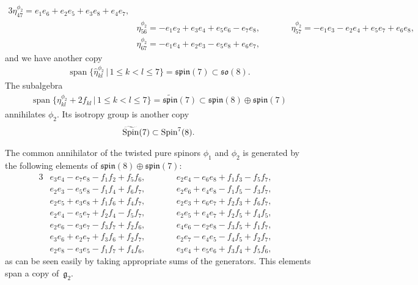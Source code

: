 \documentclass[pdftex]{sigma}
\numberwithin{equation}{section}
\begin{document}
{\begin{alignat*}{3}
 \eta^{\phi_2}_{4 7} = e_{1} e_{6} + e_{2} e_{5} + e_{3} e_{8} + e_{4} e_{7},&\\
& \eta^{\phi_2}_{5 6} = -e_{1} e_{2} + e_{3} e_{4} + e_{5} e_{6} - e_{7} e_{8},\qquad &&
 \eta^{\phi_2}_{5 7} = -e_{1} e_{3} - e_{2} e_{4} + e_{5} e_{7} + e_{6} e_{8},&\\
& \eta^{\phi_2}_{6 7} = -e_{1} e_{4} + e_{2} e_{3} - e_{5} e_{8} + e_{6} e_{7},\qquad &&&
\end{alignat*}
and we have another copy
\begin{gather*}\operatorname{span}\big\{\hat\eta_{kl}^{\phi_2} \,|\, 1\leq k<l\leq 7 \big\} = \mathfrak{spin}(7) \subset \mathfrak{so}(8).\end{gather*}
The subalgebra
\begin{gather*}\operatorname{span}\big\{\eta_{kl}^{\phi_2} + 2 f_{kl}\,|\, 1\leq k<l\leq 7 \big\} = \widetilde{\mathfrak{spin}}(7) \subset
\mathfrak{spin}(8)\oplus \mathfrak{spin}(7)\end{gather*}
annihilates ${\phi_2}$. Its isotropy group is another copy
\begin{gather*}\widetilde{\rm Spin}(7)\subset {\rm Spin}^7(8).\end{gather*}

}

The common annihilator of the twisted pure spinors $\phi_1$ and $\phi_2$ is generated by the following elements of $\mathfrak{spin}(8)\oplus \mathfrak{spin}(7)$:
\begin{alignat*}{3}
& e_3 e_4 - e_7 e_8 - f_1 f_2 + f_5 f_6,\qquad && e_2 e_4 - e_6 e_8 + f_1 f_3 - f_5 f_7,&\\
& e_2 e_3 - e_5 e_8 - f_1 f_4 + f_6 f_7,\qquad && e_2 e_6 + e_4 e_8 - f_1 f_5 - f_3 f_7,&\\
& e_2 e_5 + e_3 e_8 + f_1 f_6 + f_4 f_7,\qquad && e_2 e_3 + e_6 e_7 + f_2 f_3 + f_6 f_7,& \\
& e_2 e_4 - e_5 e_7 + f_2 f_4 - f_5 f_7,\qquad && e_2 e_5 + e_4 e_7 + f_2 f_5 + f_4 f_5,& \\
& e_2 e_6 - e_3 e_7 - f_3 f_7 + f_2 f_6,\qquad && e_4 e_6 - e_2 e_8 - f_3 f_5 + f_1 f_7,& \\
& e_3 e_6 + e_2 e_7 + f_3 f_6 + f_2 f_7,\qquad && e_2 e_7 - e_4 e_5 - f_4 f_5 + f_2 f_7,& \\
&e_2 e_8 - e_3 e_5 - f_1 f_7 + f_4 f_6,\qquad && e_3 e_4 + e_5 e_6 + f_3 f_4 + f_5 f_6,&
\end{alignat*}
as can be seen easily by taking appropriate sums of the generators. This elements span a copy of~$\mathfrak{g}_2$.
\end{document}

